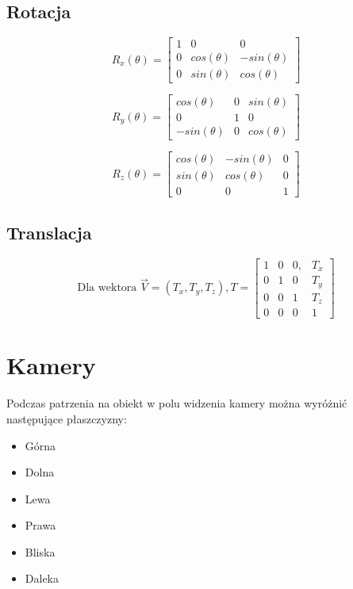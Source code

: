 \documentclass{../notatki}
\begin{document}
\subsection{Rotacja}

$$
R_x(\theta) = 
\begin{bmatrix}
    1 & 0 & 0 \\
    0 & cos(\theta) & -sin(\theta) \\
    0 & sin(\theta) & cos(\theta) 
\end{bmatrix}
$$

$$
R_y(\theta) = 
\begin{bmatrix}
    cos(\theta) & 0 & sin(\theta) \\
    0 & 1 & 0 \\
    -sin(\theta) & 0 & cos(\theta) 
\end{bmatrix}
$$

$$
R_z(\theta) = 
\begin{bmatrix}
    cos(\theta) & -sin(\theta) & 0 \\
    sin(\theta) & cos(\theta) & 0 \\
    0 & 0 & 1
\end{bmatrix}
$$

\subsection{Translacja}

$$
\text{Dla wektora }
\vec{V}=(T_x, T_y, T_z),
T=
\begin{bmatrix} 1 & 0 & 0, & T_x \\ 0 & 1 & 0 & T_y \\ 0 & 0 & 1 & T_z \\ 0 & 0 & 0 & 1 \end{bmatrix}
$$

\section{Kamery}

Podczas patrzenia na obiekt w polu widzenia kamery można wyróżnić następujące płaszczyzny:

\begin{itemize}
    \item Górna
    \item Dolna
    \item Lewa
    \item Prawa
    \item Bliska
    \item Daleka
\end{itemize}
\end{document}
